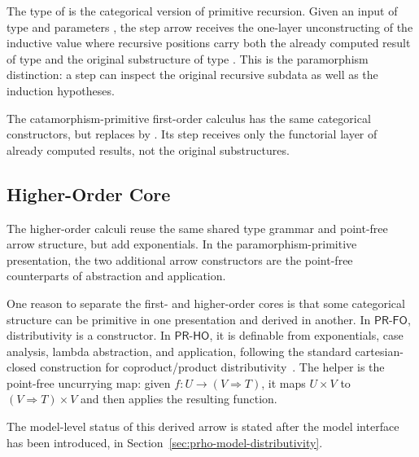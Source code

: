 \documentclass[sigplan,10pt,anonymous,review,screen]{acmart}
\newcommand{\PRFO}{\ensuremath{\mathsf{PR\mbox{-}FO}}}
\newcommand{\PRHO}{\ensuremath{\mathsf{PR\mbox{-}HO}}}
\begin{document}
{\small
\CorePRFOSyntax*
}

The type of  is the categorical version of
primitive recursion.  Given an input of type 
 and parameters , the step arrow receives the
one-layer unconstructing of the inductive value where recursive positions
carry both the already computed result of type  and the
original substructure of type  .  This is
the paramorphism distinction: a step can inspect the original recursive
subdata as well as the induction hypotheses.

The catamorphism-primitive first-order calculus has the same categorical
constructors, but replaces  by
.  Its step receives only the functorial
layer of already computed results, not the original substructures.

{\small
\CorePRFOCatamorphismPrimitive*
}

\subsection{Higher-Order Core}
\label{sec:core-calculi-ho}

The higher-order calculi reuse the same shared type grammar and
point-free arrow structure, but add exponentials.  In the
paramorphism-primitive presentation, the two additional arrow
constructors are the point-free counterparts of abstraction and
application.

{\small
\CorePRHOExponentials
}

One reason to separate the first- and higher-order cores is that some
categorical structure can be primitive in one presentation and derived
in another.  In \PRFO{}, distributivity is a constructor.  In \PRHO{},
it is definable from exponentials, case analysis, lambda abstraction,
and application, following the standard cartesian-closed construction
for coproduct/product distributivity~\cite{https://doi.org/10.48550/arxiv.1406.0961}.
The helper  is the point-free uncurrying map: given
\(f : U \to (V \Rightarrow T)\), it maps \(U \times V\) to
\((V \Rightarrow T) \times V\) and then applies the resulting function.

{\small
\CorePRHODerivedDist
}

The model-level status of this derived arrow is stated after the model
interface has been introduced, in
Section~\ref{sec:prho-model-distributivity}.
\end{document}
